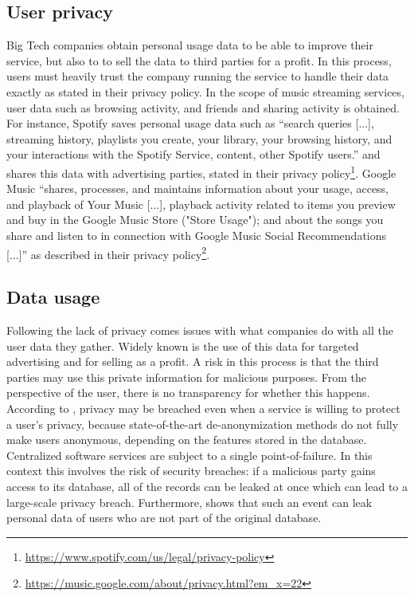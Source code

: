 \subsection{User privacy}
Big Tech companies obtain personal usage data to be able to improve their service, but also to to sell the data to third parties for a profit. In this process, users must heavily trust the company running the service to handle their data exactly as stated in their privacy policy. In the scope of music streaming services, user data such as browsing activity, and friends and sharing activity is obtained. For instance, Spotify saves personal usage data such as ``search queries [...], streaming history, playlists you create, your library, your browsing history, and your interactions with the Spotify Service, content, other Spotify users.'' and shares this data with advertising parties, stated in their privacy policy\footnote{\url{https://www.spotify.com/us/legal/privacy-policy}}. Google Music ``shares, processes, and maintains information about your usage, access, and playback of Your Music [...], playback activity related to items you preview and buy in the Google Music Store ("Store Usage"); and about the songs you share and listen to in connection with Google Music Social Recommendations [...]'' as described in their privacy policy\footnote{\url{https://music.google.com/about/privacy.html?em_x=22}}. 
\subsection{Data usage}
Following the lack of privacy comes issues with what companies do with all the user data they gather. Widely known is the use of this data for targeted advertising\cite{jessup2012big} and for selling as a profit\cite{yap2011user}. A risk in this process is that the third parties may use this private information for malicious purposes\cite{yap2011user}. From the perspective of the user, there is no transparency for whether this happens. According to \cite{narayanan2008robust}, privacy may be breached even when a service is willing to protect a user's privacy, because state-of-the-art de-anonymization methods do not fully make users anonymous, depending on the features stored in the database. Centralized software services are subject to a single point-of-failure. In this context this involves the risk of security breaches: if a malicious party gains access to its database, all of the records can be leaked at once which can lead to a large-scale privacy breach. Furthermore, \cite{dworkdifferential} shows that such an event can leak personal data of users who are not part of the original database.
